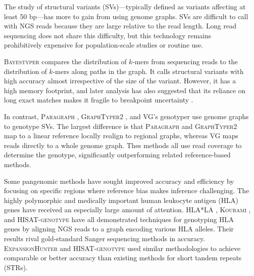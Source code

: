 The study of structural variants (SVs)---typically defined as variants affecting at least 50 bp---has more to gain from using genome graphs.
SVs are difficult to call with NGS reads because they are large relative to the read length.
Long read sequencing does not share this difficulty, but this technology remains prohibitively expensive for population-scale studies or routine use.

\textsc{Bayestyper} \cite{sibbesen2018accurate} compares the distribution of $k$-mers from sequencing reads to the distribution of $k$-mers along paths in the graph.
It calls structural variants with high accuracy almost irrespective of the size of the variant.
However, it has a high memory footprint, and later analysis has also suggested that its reliance on long exact matches makes it fragile to breakpoint uncertainty \cite{hickey2019genotyping}.

In contrast, \textsc{Paragraph} \cite{chen2019paragraph}, \textsc{GraphTyper2} \cite{eggertsson2019graphtyper2}, and \textsc{VG}'s genotyper \cite{hickey2019genotyping} use genome graphs to genotype SVs.
The largest difference is that \textsc{Paragraph} and \textsc{GraphTyper2} map to a linear reference locally realign to regional graphs, whereas VG maps reads directly to a whole genome graph.
Thes methods all use read coverage to determine the genotype, significantly outperforming related reference-based methods.

Some pangenomic methods have sought improved accuracy and efficiency by focusing on specific regions where reference bias makes inference challenging. 
The highly polymorphic and medically important human leukocyte antigen (HLA) genes have received an especially large amount of attention.
\textsc{HLA*LA} \cite{dilthey2019hla}, \textsc{Kourami} \cite{lee2018kourami}, and \textsc{HISAT-genotype} \cite{Kim_2019} have all demonstrated techniques for genotyping HLA genes by aligning NGS reads to a graph encoding various HLA alleles.
Their results rival gold-standard Sanger sequencing methods in accuracy.
\textsc{ExpansionHunter} \cite{dolzhenko2019expansionhunter} and \textsc{HISAT-genotype} \cite{Kim_2019} used similar methodologies to achieve comparable or better accuracy than existing methods for short tandem repeats (STRs).

